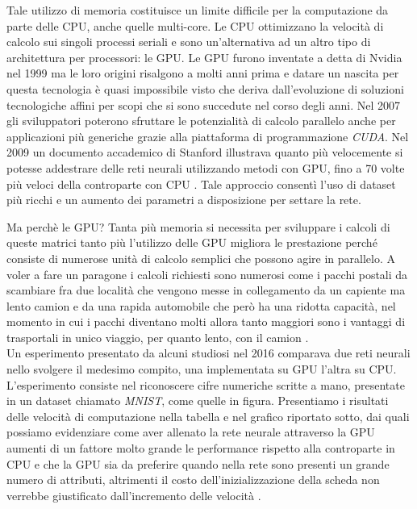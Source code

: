 Tale utilizzo di memoria costituisce un limite difficile per la computazione da parte delle CPU, anche quelle multi-core. Le CPU ottimizzano la velocità di calcolo sui singoli processi seriali e sono un'alternativa ad un altro tipo di architettura per processori: le GPU. Le GPU furono inventate a detta di Nvidia nel 1999 ma le loro origini risalgono a molti anni prima e datare un nascita per questa tecnologia è quasi impossibile visto che deriva dall'evoluzione di soluzioni tecnologiche affini per scopi che si sono succedute nel corso degli anni. Nel 2007 gli sviluppatori poterono sfruttare le potenzialità di calcolo parallelo anche per applicazioni più generiche grazie alla piattaforma di programmazione \textit{CUDA}. Nel 2009 un documento accademico di Stanford illustrava quanto più velocemente si potesse addestrare delle reti neurali utilizzando metodi con GPU, fino a 70 volte più veloci della controparte con CPU \cite{raina2009large}. Tale approccio consentì l'uso di dataset più ricchi e un aumento dei parametri a disposizione per settare la rete. 

Ma perchè le GPU? Tanta più memoria si necessita per sviluppare i calcoli di queste matrici tanto più l'utilizzo delle GPU migliora le prestazione perché consiste di numerose unità di calcolo semplici che possono agire in parallelo. A voler a fare un paragone i calcoli richiesti sono numerosi come i pacchi postali da scambiare fra due località che vengono messe in collegamento da un capiente ma lento camion e da una rapida automobile che però ha una ridotta capacità, nel momento in cui i pacchi diventano molti allora tanto maggiori sono i vantaggi di trasportali in unico viaggio, per quanto lento, con il camion \cite{quora:why_gpu}.
\\
Un esperimento presentato da alcuni studiosi nel 2016 comparava due reti neurali nello svolgere il medesimo compito, una implementata su GPU l'altra su CPU. L'esperimento consiste nel riconoscere cifre numeriche scritte a mano, presentate in un dataset chiamato \textit{MNIST}, come quelle in figura. Presentiamo i risultati delle velocità di computazione nella tabella e nel grafico riportato sotto, dai quali possiamo evidenziare come aver allenato la rete neurale attraverso la GPU aumenti di un fattore molto grande le performance rispetto alla controparte in CPU e che la GPU sia da preferire quando nella rete sono presenti un grande numero di attributi, altrimenti il costo dell'inizializzazione della scheda non verrebbe giustificato dall'incremento delle velocità \cite{brito2016gpu}.

